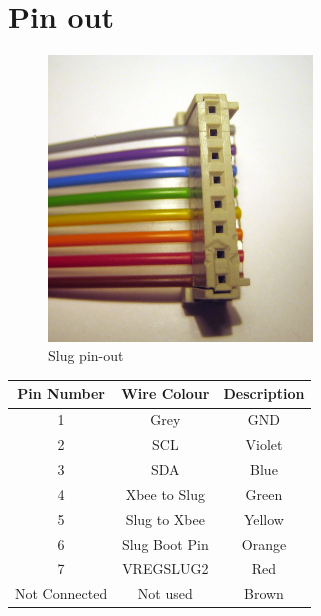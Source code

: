 \documentclass[a4paper, 12pt]{article}
\begin{document}
\clearpage
\newpage

\section {Pin out}

\begin{figure}[ht]
\begin{center}
\includegraphics[keepaspectratio, width=7cm]{./images/slugpins.png}
\caption {\label{slug-pinout}Slug pin-out}
\end{center}
\end{figure}

\begin{center}
\begin{tabular}{|c|c|c|}
\hline
\textbf {Pin Number} & \textbf {Wire Colour} & \textbf {Description}\\
\hline
1 & Grey & GND\\
2 & SCL & Violet\\
3 & SDA & Blue\\
4 & Xbee to Slug & Green\\
5 & Slug to Xbee & Yellow\\
6 & Slug Boot Pin & Orange\\
7 & VREGSLUG2 & Red\\
Not Connected & Not used & Brown\\
\hline
\end{tabular}
\end{center}
\end{document}
